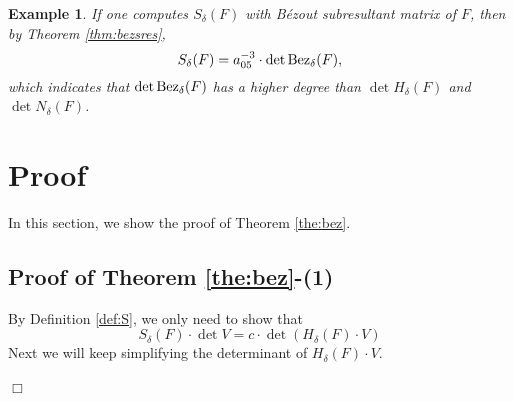 \documentclass{article}
\newtheorem{example}[theorem]{Example}
\newenvironment{proof}{\noindent{\em Proof:}}{$\Box$~\\}
\begin{document}
\begin{example}
If one computes ${S_\delta }(F)$ with B\'ezout subresultant matrix of $F$, then by Theorem \ref{thm:bezsres}, 
$${S_\delta }(F) ={a_{05}^{-3}}\cdot\det {\rm Bez}_\delta(F), $$
which indicates that $\det {\rm Bez}_\delta(F)$ has a higher degree than
$\det {H}_\delta(F)$ and $\det {N}_\delta(F)$.
\end{example}

\section{Proof}\label{sec:proof}
In this section, we show the proof of Theorem \ref{the:bez}.
\subsection{Proof of Theorem \ref{the:bez}-(1)}
\begin{proof}
By Definition \ref{def:S}, we only need to show that
  $${S_\delta }(F) \cdot \det V =  c \cdot \det (H_\delta (F) \cdot V)$$
Next we will keep simplifying the  determinant of $H_\delta (F) \cdot V$.


\end{proof}
\end{document}
